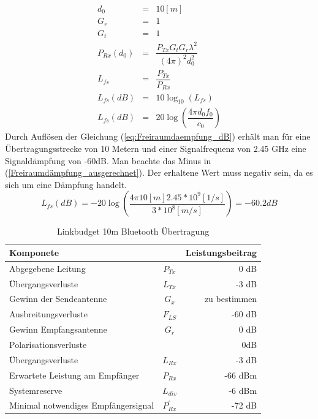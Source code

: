 \begin{eqnarray}
  	d_{0} 	&=& 10 [m] \\ \label{eq:d0_LinkBudget}
  G_r		&=& 1 \\ \label{eq:Gr_LinkBudget}
	G_t 		&=& 1 \\ \label{eq:Gt_LinkBudget}
  P_{Rx}(d_0) 	&=& \dfrac{P_{Tx}G_t G_r\lambda^2}{(4\pi)^2 d_0^2} \\ \label{eq:Prx_LinkBudget}
  L_{fs} 		&=& \dfrac{P_{Tx}}{P_{Rx}} \\ \label{eq:Freiraumdaempfung}
  L_{fs}(dB) 	&=& 10\log_{10}(L_{fs}) \\ \label{eq:Freiraumdaempfung_dB}
  L_{fs}(dB) 	&=& 20\log(\dfrac{4\pi d_0 f_0}{c_0}) \label{eq:Freiraumdaempfung_dB_aufgelöst} 
\end{eqnarray}
Durch Auflösen der Gleichung (\ref{eq:Freiraumdaempfung_dB}) erhält man für eine Übertragungsstrecke von 10 Metern und einer Signalfrequenz von 2.45 GHz eine Signaldämpfung von -60dB. Man beachte das Minus in (\ref{Freiraumdämpfung_ausgerechnet}). Der erhaltene Wert muss negativ sein, da es sich um eine Dämpfung handelt.
\begin{equation}\label{Freiraumdämpfung_ausgerechnet}
  L_{fs}(dB) = -20\log(\dfrac{4\pi 10[m] 2.45*10^9 [1/s] }{3*10^8[m/s]}) =-60.2dB
\end{equation}

\begin{table}[!ht]
 \centering
 \begin{tabular}{l c r} \toprule 
 Komponete               	& 			&Leistungsbeitrag  \\ \midrule
  Abgegebene Leitung    			&$P_{Tx}$ 	& 0 dB       \\
  Übergangsverluste              &$L_{Tx}$	& -3 dB       \\
  Gewinn der Sendeantenne    	&$G_{x}$		& zu bestimmen        \\
  Ausbreitungsverluste   		& $F_{LS}$	& -60 dB        \\
  Gewinn Empfangsantenne  		& $G_{r}$	& 0 dB           \\
  Polarisationsverluste          & 	& 0dB            \\
  Übergangsverluste              & $L_{Rx}$	& -3 dB            \\
  Erwartete Leistung am Empfänger & $P_{Rx}$  & -66 dBm \cite{CC2541} \\ \midrule
  Systemreserve        			 & $L_{div}$&-6 dBm \\ 
  Minimal notwendiges Empfängersignal &$P_{Rx}^{'}$ & -72 dB \\ \bottomrule
  \end{tabular}
  \caption{Linkbudget 10m Bluetooth Übertragung}
  \label{tab:Linkbudget}
\end{table}

